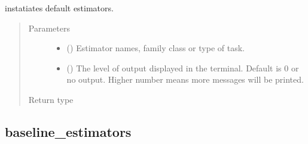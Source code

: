 \documentclass[letterpaper,10pt,english]{sphinxmanual}
\begin{document}
\begin{fulllineitems}
\label{\detokenize{estimators:mleap.estimators.estimators.instantiate_default_estimators}}
instatiates default estimators.
\begin{quote}\begin{description}
\item[{Parameters}] \leavevmode\begin{itemize}
\item {} 
 () \textendash{} Estimator names, family class or type of task.

\item {} 
 () \textendash{} The level of output displayed in the terminal. Default is 0  
or no  output. Higher number means more messages will be printed.

\end{itemize}

\item[{Return type}] \leavevmode
{}

\end{description}\end{quote}

\end{fulllineitems}



\subsection{baseline\_estimators}
\label{\detokenize{estimators:module-mleap.estimators.baseline_estimators}}\label{\detokenize{estimators:baseline-estimators}}
\end{document}
